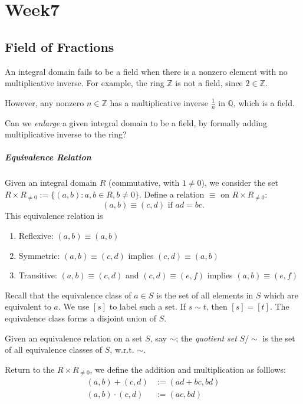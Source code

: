 
\chapter{Week7}
\section{Field of Fractions}

An integral domain fails to be a field when there is a nonzero element with no multiplicative inverse. For example, the ring $\mathbb{Z}$ is not a field, since $2\in\mathbb{Z}$.

However, any nonzero $n\in\mathbb{Z}$ has a multiplicative inverse $\frac{1}{n}$ in $\mathbb{Q}$, which is a field.

Can we \emph{enlarge} a given integral domain to be a field, by formally adding multiplicative inverse to the ring?

\paragraph{Equivalence Relation}
Given an integral domain $R$ (commutative, with $1\ne0$), we consider the set $R\times R_{\ne0}:=\{(a,b):a,b\in R,b\ne0\}.$ Define a relation $\equiv$ on $R\times R_{\ne0}$:
\[
(a,b)\equiv(c,d)\mbox{ if }ad=bc.
\]
This equivalence relation is
\begin{enumerate}
\item
Reflexive: $(a,b)\equiv(a,b)$
\item
Symmetric: $(a,b)\equiv(c,d)$ implies $(c,d)\equiv(a,b)$
\item
Transitive: $(a,b)\equiv(c,d)$ and $(c,d)\equiv(e,f)$ implies $(a,b)\equiv(e,f)$
\end{enumerate}

Recall that the equivalence class of $a\in S$ is the set of all elements in $S$ which are equivalent to $a$. We use $[s]$ to label such a set. If $s\sim t$, then $[s]=[t]$. The equivalence class forms a disjoint union of $S$.

\begin{definition}
Given an equivalence relation on a set $S$, say $\sim$; the \emph{quotient set} $S/\sim$ is the set of all equivalence classes of $S$, w.r.t. $\sim$.
\end{definition}

Return to the $R\times R_{\ne0}$, we define the addition and multiplication as folllows:
\begin{align*}
(a,b)+(c,d)&:=(ad+bc,bd)\\
(a,b)\cdot(c,d)&:=(ac,bd)
\end{align*}


